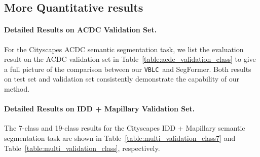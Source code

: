 \documentclass[letterpaper]{article} \usepackage{aaai23}  \usepackage{times}  \usepackage{helvet}  \usepackage{courier}  \usepackage[hyphens]{url}  \usepackage{graphicx} \urlstyle{rm} \def\UrlFont{\rm}  \usepackage{natbib}  \usepackage{caption} \frenchspacing  \setlength{\pdfpagewidth}{8.5in}  \setlength{\pdfpageheight}{11in}  \usepackage{algorithm}
\newcommand{\method}{\texttt{VBLC}~}
\begin{document}
\subsection{More Quantitative results}
\label{sec:more_quantitative}

\paragraph{Detailed Results on ACDC Validation Set.}
For the Cityscapes  ACDC semantic segmentation task, we list the evaluation result on the ACDC validation set in Table~\ref{table:acdc_validation_class} to give a full picture of the comparison between our \method and SegFormer. Both results on test set and validation set consistently demonstrate the capability of our method.

\paragraph{Detailed Results on IDD + Mapillary Validation Set.}
The 7-class and 19-class results for the Cityscapes  IDD + Mapillary semantic segmentation task are shown in Table~\ref{table:multi_validation_class7} and Table~\ref{table:multi_validation_class}, respectively.


\begin{table}[!htbp]
  \centering
  \caption{Effect of ema update ratio .}
  \label{table:alpha}
\end{table}

\begin{table}[!htbp]
  \centering
  \caption{Effect of pseudo threshold .}
  \label{table:pseudo}
\end{table}
\end{document}

